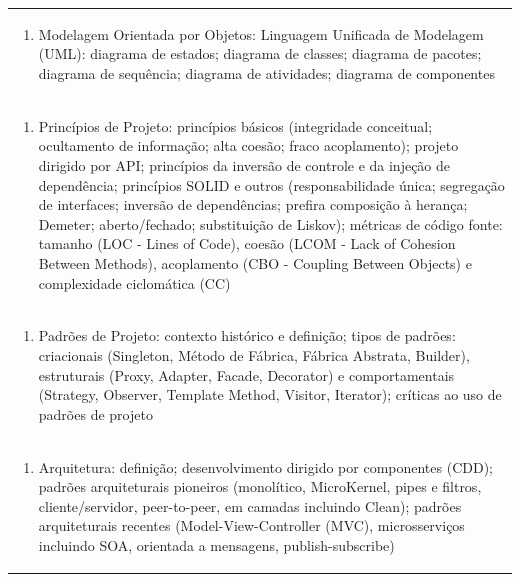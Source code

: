 \documentclass[11pt]{article}
\begin{document}
\begin{center}
\begin{longtable}{|p{4cm}|p{4cm}|p{4cm}|p{4cm}|}
\multicolumn{4}{|p{\dimexpr 16cm + 6\tabcolsep\relax}|}{\begin{enumerate}[start=2]\item Modelagem Orientada por Objetos: Linguagem Unificada de Modelagem (UML): diagrama de estados; diagrama de classes; diagrama de pacotes; diagrama de sequência; diagrama de atividades; diagrama de componentes\end{enumerate}}\\
\multicolumn{4}{|p{\dimexpr 16cm + 6\tabcolsep\relax}|}{\begin{enumerate}[start=3]\item Princípios de Projeto: princípios básicos (integridade conceitual; ocultamento de informação; alta coesão; fraco acoplamento); projeto dirigido por API; princípios da inversão de controle e da injeção de dependência; princípios SOLID e outros (responsabilidade única; segregação de interfaces; inversão de dependências; prefira composição à herança; Demeter; aberto/fechado; substituição de Liskov); métricas de código fonte: tamanho (LOC - Lines of Code), coesão (LCOM - Lack of Cohesion Between Methods), acoplamento (CBO - Coupling Between Objects) e complexidade ciclomática (CC)\end{enumerate}}\\
\multicolumn{4}{|p{\dimexpr 16cm + 6\tabcolsep\relax}|}{\begin{enumerate}[start=4]\item Padrões de Projeto: contexto histórico e definição; tipos de padrões: criacionais (Singleton, Método de Fábrica, Fábrica Abstrata, Builder), estruturais (Proxy, Adapter, Facade, Decorator) e comportamentais (Strategy, Observer, Template Method, Visitor, Iterator); críticas ao uso de padrões de projeto\end{enumerate}}\\
\multicolumn{4}{|p{\dimexpr 16cm + 6\tabcolsep\relax}|}{\begin{enumerate}[start=5]\item Arquitetura: definição; desenvolvimento dirigido por componentes (CDD); padrões arquiteturais pioneiros (monolítico, MicroKernel, pipes e filtros, cliente/servidor, peer-to-peer, em camadas incluindo Clean); padrões arquiteturais recentes (Model-View-Controller (MVC), microsserviços incluindo SOA, orientada a mensagens, publish-subscribe)\end{enumerate}}\\

\end{longtable}
\end{center}
\end{document}
